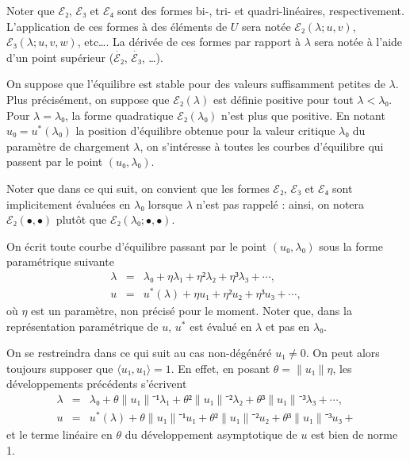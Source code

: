 \documentclass[12pt, final]{amsart}
\begin{document}
Noter que \(ℰ₂\), \(ℰ₃\) et \(ℰ₄\) sont des formes bi-, tri- et quadri-linéaires,
respectivement. L'application de ces formes à des éléments de \(U\) sera notée
\(ℰ₂(λ; u, v)\), \(ℰ₃(λ; u, v, w)\), etc\dots. La dérivée de ces formes par
rapport à \(λ\) sera notée à l'aide d'un point supérieur (\(\dot{ℰ₂}\),
\(\dot{ℰ₃}\), \dots).

On suppose que l'équilibre est stable pour des valeurs suffisamment petites de
\(λ\). Plus précisément, on suppose que \(ℰ₂(λ)\) est définie positive pour tout
\(λ<λ₀\). Pour \(λ=λ₀\), la forme quadratique \(ℰ₂(λ₀)\) n'est plus que
positive. En notant \(u₀=u^*(λ₀)\) la position d'équilibre obtenue pour la
valeur critique \(λ₀\) du paramètre de chargement \(λ\), on s'intéresse à
toutes les courbes d'équilibre qui passent par le point \((u₀, λ₀)\).

Noter que dans ce qui suit, on convient que les formes \(ℰ₂\), \(ℰ₃\) et \(ℰ₄\)
sont implicitement évaluées en \(λ₀\) lorsque \(λ\) n'est pas rappelé : ainsi,
on notera \(ℰ₂(•, •)\) plutôt que \(ℰ₂(λ₀; •, •)\).

On écrit toute courbe d'équilibre passant par le point \((u₀, λ₀)\) sous la
forme paramétrique suivante
\begin{eqnarray}
  \label{eq:20211115075817}
  λ&=&λ₀+ηλ₁+η²λ₂+η³λ₃+\cdots,\\
  \label{eq:20211115075835}
  u&=&u^*(λ)+ηu₁+η²u₂+η³u₃+\cdots,
\end{eqnarray}
où \(η\) est un paramètre, non précisé pour le moment. Noter que, dans la
représentation paramétrique de \(u\), \(u^*\) est évalué en \(λ\) et pas en
\(λ₀\).

On se restreindra dans ce qui suit au cas non-dégénéré \(u₁≠0\). On peut alors
toujours supposer que \(〈u₁, u₁〉=1\).  En effet, en posant \(θ=\lVert u₁\rVert η\), les développements
précédents s'écrivent
\begin{eqnarray}
  λ&=&λ₀+θ\lVert u₁\rVert⁻¹λ₁+θ²\lVert u₁\rVert⁻²λ₂+θ³\lVert u₁\rVert⁻³λ₃+\cdots,\\
  u&=&u^*(λ)+θ\lVert u₁\rVert⁻¹u₁+θ²\lVert u₁\rVert⁻²u₂+θ³\lVert u₁\rVert⁻³u₃+
\end{eqnarray}
et le terme linéaire en \(θ\) du développement asymptotique de \(u\) est bien
de norme 1.
\end{document}

